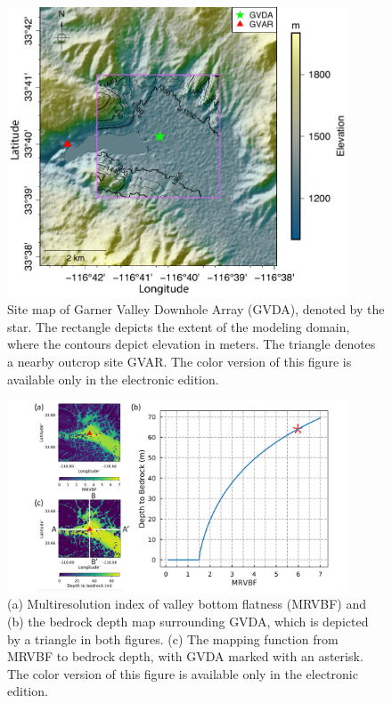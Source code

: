 {\clearpage
\begin{figure}[!ht]
  \centering
  \includegraphics[width=0.9\textwidth]{figures/figure_etf_1.pdf}
  \caption{Site map of Garner Valley Downhole Array (GVDA), denoted by the star. The rectangle depicts the extent of the modeling domain, where the contours depict elevation in meters. The triangle denotes a nearby outcrop site GVAR. The color version of this figure is available only in the electronic edition.}
  \label{fig:etf-1}
\end{figure}

\clearpage
\begin{figure}[!ht]
  \centering
  \includegraphics[width=0.9\textwidth]{figures/figure_etf_2.pdf}
  \caption{(a) Multiresolution index of valley bottom flatness (MRVBF) and (b) the bedrock depth map surrounding GVDA, which is depicted by a triangle in both figures. (c) The mapping function from MRVBF to bedrock depth, with GVDA marked with an asterisk. The color version of this figure is available only in the electronic edition.}
  \label{fig:etf-2}
\end{figure}

}
